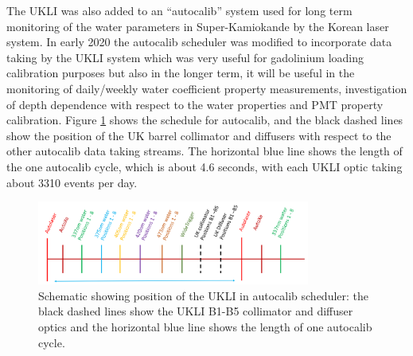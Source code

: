 \begin{figure}
    
\end{figure}

The UKLI was also added to an ``autocalib'' system used for long term monitoring of the water parameters in Super-Kamiokande by the Korean laser system. In early 2020 the autocalib scheduler was modified to incorporate data taking by the UKLI system which was very useful for gadolinium loading calibration purposes but also in the longer term, it will be useful in the monitoring of daily/weekly water coefficient property measurements, investigation of depth dependence with respect to the water properties and PMT property calibration. Figure \ref{fig:autocalib} shows the schedule for autocalib, and the black dashed lines show the position of the UK barrel collimator and diffusers with respect to the other autocalib data taking streams. The horizontal blue line shows the length of the one autocalib cycle, which is about 4.6 seconds, with each UKLI optic taking about 3310 events per day.

\begin{figure}
    \centering
    \includegraphics[width=0.8\textwidth]{Figures/autocalib.png}
    \caption{Schematic showing position of the UKLI in autocalib scheduler: the black dashed lines show the UKLI B1-B5 collimator and diffuser optics and the horizontal blue line shows the length of one autocalib cycle.}
    \label{fig:autocalib}
\end{figure}

